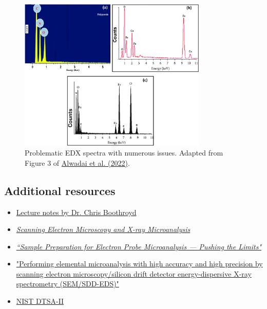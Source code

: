 \documentclass[letterpaper, 12pt]{article}
\begin{document}
\begin{figure}[h!tbp]
    \centering
    \includegraphics[width=0.8\textwidth]{img/edx/alwadai_edx.png}
    \caption*{Problematic EDX spectra with numerous issues. Adapted from Figure 3 of \href{https://doi.org/10.1007/s10854-022-08265-y}{Alwadai et al. (2022)}.}
\end{figure}

\subsection*{Additional resources}

\begin{itemize}
    \setlength\itemsep{-0.5em}
    \item \href{https://fy.chalmers.se/~f10mh/Halvarsson/EM_intro_course_files/EDX%20intro.pdf}{Lecture notes by Dr. Chris Boothroyd}
    \item \href{https://doi.org/10.1007/978-1-4939-6676-9}{\textit{Scanning Electron Microscopy and X-ray Microanalysis}}
    \item  \href{https://doi.org/10.6028/jres.107.051}{\textit{``Sample Preparation for Electron Probe
Microanalysis — Pushing the Limits"}}
    \item \href{https://doi.org/10.1007/s10853-014-8685-2}{"Performing elemental microanalysis with high accuracy and high precision by scanning electron microscopy/silicon drift detector energy-dispersive X-ray spectrometry (SEM/SDD-EDS)"}
    \item \href{https://www.cstl.nist.gov/div837/837.02/epq/dtsa2/index.html}{NIST DTSA-II}
\end{itemize}

\end{document}

